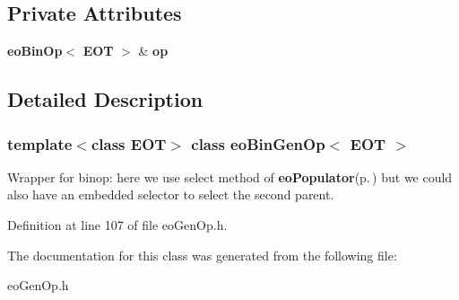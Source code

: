 \subsection*{Private Attributes}
\begin{CompactItemize}
\item 
{\bf eo\-Bin\-Op}$<$ {\bf EOT} $>$ \& {\bf op}\label{classeo_bin_gen_op_r0}

\end{CompactItemize}


\subsection{Detailed Description}
\subsubsection*{template$<$class EOT$>$ class eo\-Bin\-Gen\-Op$<$ EOT $>$}

Wrapper for binop: here we use select method of {\bf eo\-Populator}{\rm (p.\,\pageref{classeo_populator})} but we could also have an embedded selector to select the second parent. 



Definition at line 107 of file eo\-Gen\-Op.h.

The documentation for this class was generated from the following file:\begin{CompactItemize}
\item 
eo\-Gen\-Op.h\end{CompactItemize}
